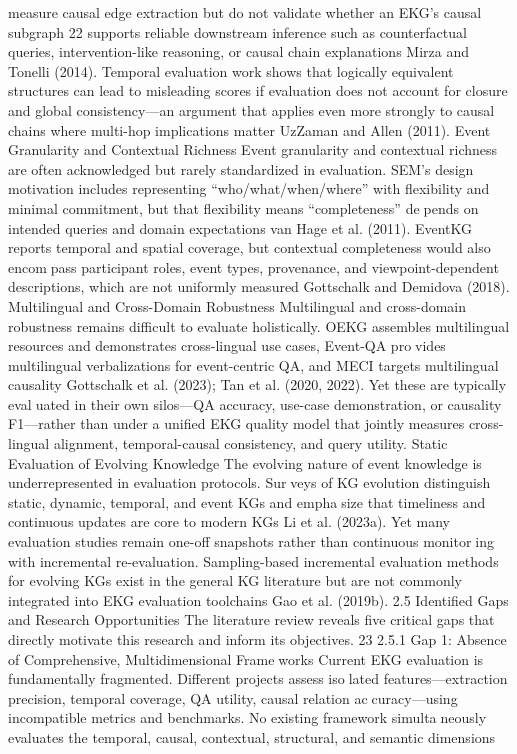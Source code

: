 measure causal edge extraction but do not validate whether an EKG’s causal subgraph
22
supports reliable downstream inference such as counterfactual queries, intervention-like
reasoning, or causal chain explanations Mirza and Tonelli (2014). Temporal evaluation
work shows that logically equivalent structures can lead to misleading scores if evaluation
does not account for closure and global consistency—an argument that applies even more
strongly to causal chains where multi-hop implications matter UzZaman and Allen (2011).
Event Granularity and Contextual Richness
Event granularity and contextual richness are often acknowledged but rarely standardized
in evaluation. SEM’s design motivation includes representing “who/what/when/where”
with flexibility and minimal commitment, but that flexibility means “completeness” depends on intended queries and domain expectations van Hage et al. (2011). EventKG
reports temporal and spatial coverage, but contextual completeness would also encompass participant roles, event types, provenance, and viewpoint-dependent descriptions,
which are not uniformly measured Gottschalk and Demidova (2018).
Multilingual and Cross-Domain Robustness
Multilingual and cross-domain robustness remains difficult to evaluate holistically. OEKG
assembles multilingual resources and demonstrates cross-lingual use cases, Event-QA provides multilingual verbalizations for event-centric QA, and MECI targets multilingual
causality Gottschalk et al. (2023); Tan et al. (2020, 2022). Yet these are typically evaluated in their own silos—QA accuracy, use-case demonstration, or causality F1—rather
than under a unified EKG quality model that jointly measures cross-lingual alignment,
temporal-causal consistency, and query utility.
Static Evaluation of Evolving Knowledge
The evolving nature of event knowledge is underrepresented in evaluation protocols. Surveys of KG evolution distinguish static, dynamic, temporal, and event KGs and emphasize that timeliness and continuous updates are core to modern KGs Li et al. (2023a).
Yet many evaluation studies remain one-off snapshots rather than continuous monitoring with incremental re-evaluation. Sampling-based incremental evaluation methods for
evolving KGs exist in the general KG literature but are not commonly integrated into
EKG evaluation toolchains Gao et al. (2019b).
2.5 Identified Gaps and Research Opportunities
The literature review reveals five critical gaps that directly motivate this research and
inform its objectives.
23
2.5.1 Gap 1: Absence of Comprehensive, Multidimensional Frameworks
Current EKG evaluation is fundamentally fragmented. Different projects assess isolated features—extraction precision, temporal coverage, QA utility, causal relation accuracy—using incompatible metrics and benchmarks. No existing framework simultaneously evaluates the temporal, causal, contextual, structural, and semantic dimensions
